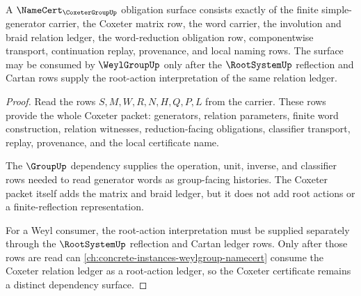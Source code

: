 \begin{theorem}
\label{thm:coxeter-group-namecert-obligations}
A $\NameCert_{\CoxeterGroupUp}$ obligation surface consists exactly of the finite simple-generator carrier, the Coxeter matrix row, the word carrier, the involution and braid relation ledger, the word-reduction obligation row, componentwise transport, continuation replay, provenance, and local naming rows. The surface may be consumed by $\WeylGroupUp$ only after the $\RootSystemUp$ reflection and Cartan rows supply the root-action interpretation of the same relation ledger.
\end{theorem}
\begin{proof}
Read the rows $S,M,W,R,N,H,Q,P,L$ from the carrier. These rows provide the whole Coxeter packet: generators, relation parameters, finite word construction, relation witnesses, reduction-facing obligations, classifier transport, replay, provenance, and the local certificate name.

The $\GroupUp$ dependency supplies the operation, unit, inverse, and classifier rows needed to read generator words as group-facing histories. The Coxeter packet itself adds the matrix and braid ledger, but it does not add root actions or a finite-reflection representation.

For a Weyl consumer, the root-action interpretation must be supplied separately through the $\RootSystemUp$ reflection and Cartan ledger rows. Only after those rows are read can \autoref{ch:concrete-instances-weylgroup-namecert} consume the Coxeter relation ledger as a root-action ledger, so the Coxeter certificate remains a distinct dependency surface.
\end{proof}




